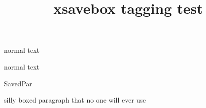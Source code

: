 \documentclass{article}
\title{xsavebox tagging test}
\begin{document}
\newsavebox{\blah}
normal text \usebox\blah

normal text 

\begin{xlrbox}{SavedPar}
\begin{minipage}[b]{1in}
silly boxed paragraph that no one will ever use
\end{minipage}
\end{xlrbox}

\end{document}
